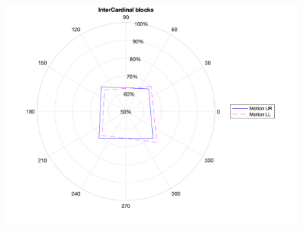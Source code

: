 \documentclass[11pt]{article} %
\begin{document}
\begin{figure}[H]
\includegraphics[scale=.15]{Images/FH_oblique_plot.png}
\end{figure}
\end{document}
